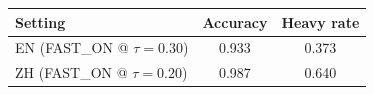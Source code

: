 \newcommand{\ENacc}{0.933}
\newcommand{\ENheavy}{0.373}
\newcommand{\ZHacc}{0.987}
\newcommand{\ZHheavy}{0.640}

\begin{tabular}{lcc}
\toprule
Setting & Accuracy & Heavy rate \\
\midrule
EN (FAST\_ON @ $\tau{=}0.30$) & \ENacc & \ENheavy \\
ZH (FAST\_ON @ $\tau{=}0.20$) & \ZHacc & \ZHheavy \\
\bottomrule
\end{tabular}
